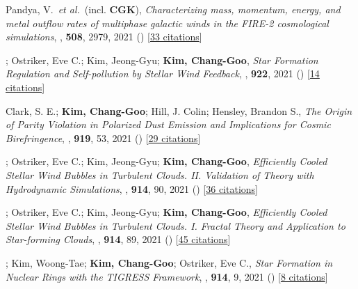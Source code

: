 \item[{36.}]Pandya, V.~\textit{et al.}~(incl. \textbf{CGK}), \textit{Characterizing mass, momentum, energy, and metal outflow rates of multiphase galactic winds in the FIRE-2 cosmological simulations}, , \textbf{508}, 2979, 2021 () [\href{http://adsabs.harvard.edu/abs/2021MNRAS.508.2979P}{33 citations}]

\item[{35.}]; Ostriker, Eve C.; Kim, Jeong-Gyu; \textbf{Kim, Chang-Goo}, \textit{Star Formation Regulation and Self-pollution by Stellar Wind Feedback}, , \textbf{922}, 2021 () [\href{http://adsabs.harvard.edu/abs/2021ApJ...922L...3L}{14 citations}]

\item[{34.}]Clark, S. E.; \textbf{Kim, Chang-Goo}; Hill, J. Colin; Hensley, Brandon S., \textit{The Origin of Parity Violation in Polarized Dust Emission and Implications for Cosmic Birefringence}, , \textbf{919}, 53, 2021 () [\href{http://adsabs.harvard.edu/abs/2021ApJ...919...53C}{29 citations}]

\item[{33.}]; Ostriker, Eve C.; Kim, Jeong-Gyu; \textbf{Kim, Chang-Goo}, \textit{Efficiently Cooled Stellar Wind Bubbles in Turbulent Clouds. II. Validation of Theory with Hydrodynamic Simulations}, , \textbf{914}, 90, 2021 () [\href{http://adsabs.harvard.edu/abs/2021ApJ...914...90L}{36 citations}]

\item[{32.}]; Ostriker, Eve C.; Kim, Jeong-Gyu; \textbf{Kim, Chang-Goo}, \textit{Efficiently Cooled Stellar Wind Bubbles in Turbulent Clouds. I. Fractal Theory and Application to Star-forming Clouds}, , \textbf{914}, 89, 2021 () [\href{http://adsabs.harvard.edu/abs/2021ApJ...914...89L}{45 citations}]

\item[{31.}]; Kim, Woong-Tae; \textbf{Kim, Chang-Goo}; Ostriker, Eve C., \textit{Star Formation in Nuclear Rings with the TIGRESS Framework}, , \textbf{914}, 9, 2021 () [\href{http://adsabs.harvard.edu/abs/2021ApJ...914....9M}{8 citations}]

